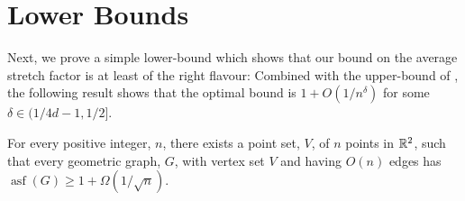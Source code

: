 \documentclass{patmorin}
\DeclareMathOperator{\asf}{asf}
\begin{document}
\section{Lower Bounds}

Next, we prove a simple lower-bound which shows that our bound on the
average stretch factor is at least of the right flavour: Combined with
the upper-bound of , the following result shows that
the optimal bound is $1+O(1/n^{\delta})$ for some $\delta\in(1/4d-1,1/2]$.

\begin{thm}
  For every positive integer, $n$, there exists a point set, $V$, of $n$
  points in $\mathbb{R}^2$, such that every geometric graph, $G$, with vertex
  set $V$ and having $O(n)$ edges has $\asf(G)\ge 1 + \Omega(1/\sqrt{n})$.
\end{thm}
\end{document}
